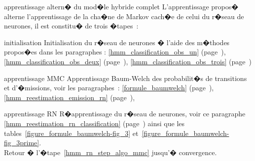             \begin{xalgorithm}{apprentissage altern� du mod�le hybride complet}
            \label{algorithme_apprentissge_modelel_complet_1}%
            L'apprentissage propos� alterne l'apprentissage de la cha�ne de Markov cach�e de celui du r�seau de neurones, 
            il est constitu� de trois �tapes~:
            
            \begin{xalgostep}{initialisation}
                    Initialisation du r�seau de neurones � l'aide des m�thodes propos�es dans les paragraphes :
                            \ref{hmm_classification_obs_un}         (page~\pageref{hmm_classification_obs_un}),
                            \ref{hmm_classification_obs_deux}       (page~\pageref{hmm_classification_obs_deux}),
                            \ref{hmm_classification_obs_trois}      (page~\pageref{hmm_classification_obs_trois})
            \end{xalgostep}
            
            \begin{xalgostep}{apprentissage MMC}\label{hmm_rn_step_algo_mmc}
                    Apprentissage Baum-Welch des probabilit�s de transitions et d'�missions, voir les paragraphes~:
                            \ref{formule_baumwelch}                 (page~\pageref{formule_baumwelch}),
                            \ref{hmm_reestimation_emission_rn}      (page~\pageref{hmm_reestimation_emission_rn}),
            \end{xalgostep}
            
            \begin{xalgostep}{apprentissage RN}
                    R�apprentissage du r�seau de neurones, voir ce paragraphe
                            \ref{hmm_reestimation_rn_classification} (page~\pageref{hmm_reestimation_rn_classification}) 
                            ainsi que les tables~\ref{figure_formule_baumwelch-fig_3}
                            et~\ref{figure_formule_baumwelch-fig_3prime}. \\
                    Retour � l'�tape~\ref{hmm_rn_step_algo_mmc} jusqu'� convergence.
            \end{xalgostep}
            
            \end{xalgorithm}
            





